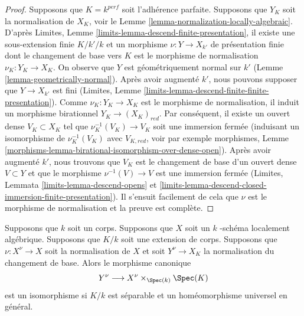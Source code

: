 \begin{proof}
Supposons que $K = k^{perf}$ soit l'adhérence parfaite.
Supposons que $Y_K$ soit la normalisation de $X_K$, voir le
Lemme \ref{lemma-normalization-locally-algebraic}. D'après
Limites, Lemme \ref{limits-lemma-descend-finite-presentation}, il
existe une sous-extension finie $K/k'/k$ et un morphisme $\nu : Y
\to X_{k'}$ de présentation finie dont le changement de base vers
$K$ est le morphisme de normalisation $\nu_K : Y_K \to X_K$. On
observe que $Y$ est géométriquement normal sur $k'$ (Lemme
\ref{lemma-geometrically-normal}). Après avoir augmenté $k'$,
nous pouvons supposer que $Y \to X_{k'}$ est fini (Limites, Lemme
\ref{limits-lemma-descend-finite-finite-presentation}). Comme
$\nu_K : Y_K \to X_K$ est le morphisme de normalisation, il induit
un morphisme birationnel $Y_K \to (X_K)_{red}$. Par conséquent, il
existe un ouvert dense $V_K \subset X_K$ tel que $\nu_K^{-1}(V_K)
\to V_K$ soit une immersion fermée (induisant un isomorphisme de
$\nu_K^{-1}(V_K)$ avec $V_{K, red}$, voir par exemple morphismes,
Lemme
\ref{morphisms-lemma-birational-isomorphism-over-dense-open}). Après avoir
augmenté $k'$, nous trouvons que $V_K$ est le changement de base d'un ouvert
dense $V \subset Y$ et que le morphisme $\nu^{-1}(V) \to V$ est une
immersion fermée (Limites, Lemmata \ref{limits-lemma-descend-opens} et
\ref{limits-lemma-descend-closed-immersion-finite-presentation}). Il s'ensuit
facilement de cela que $\nu$ est le morphisme de normalisation et la preuve est complète.
\end{proof}

\begin{lemma}
\label{lemma-normalization-and-change-of-fields}
Supposons que $k$ soit un corps. Supposons que $X$ soit un $k$ -schéma
localement algébrique. Supposons que $K/k$ soit une extension de corps.
Supposons que $\nu : X^\nu \to X$ soit la normalisation de $X$ et soit $Y^\nu
\to X_K$ la normalisation du changement de base. Alors le morphisme canonique
$$
Y^\nu \longrightarrow X^\nu \times_{\Spec(k)} \Spec(K)
$$
est un isomorphisme si $K/k$ est séparable
et un homéomorphisme universel en général.
\end{lemma}

